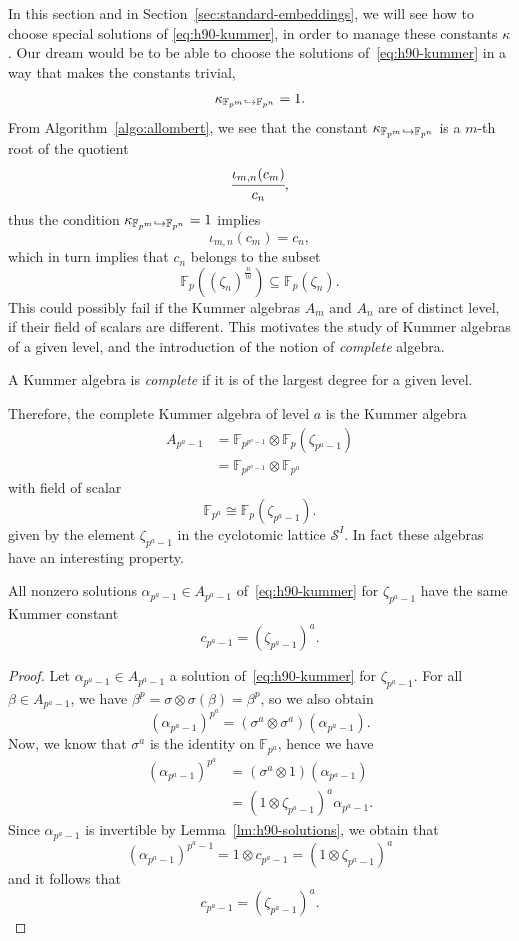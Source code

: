 In this section and in Section~\ref{sec:standard-embeddings}, we will see how to
choose special solutions of \eqref{eq:h90-kummer}, in order to manage these
constants $\kappa$. Our dream would be to be able to choose the solutions
of~\eqref{eq:h90-kummer} in a way that makes the constants trivial, \ie 
\[
  \kappa_{\mathbb{F}_{p^{m}}\hookrightarrow \mathbb{F}_{p^{n}}} = 1.
\]
From Algorithm~\ref{algo:allombert}, we see that the constant
$\kappa_{\mathbb{F}_{p^{m}}\hookrightarrow\mathbb{F}_{p^{n}}}$ is a $m$-th root of the
quotient
\[
  \cfrac{\iota_{m, n}(c_m)}{c_n},
\]
thus the condition $\kappa_{\mathbb{F}_{p^{m}}\hookrightarrow\mathbb{F}_{p^{n}}}=1$ implies
\[
  \iota_{m, n}(c_m) = c_n,
\]
which in turn implies that $c_n$ belongs to the subset
\[
  \mathbb{F}_{p}( (\zeta_n)^{\frac{n}{m}})\subseteq\mathbb{F}_p(\zeta_n).
\]
This could possibly fail if the Kummer algebras $A_m$ and $A_n$ are of distinct
level, \ie if their field of scalars are different. This motivates the study of
Kummer algebras of a given level, and the introduction of the notion of
\emph{complete} algebra.
\begin{defi}
  A Kummer algebra is \emph{complete} if it is of the largest degree for a given
  level.
\end{defi}
Therefore, the complete Kummer algebra of level $a$ is the Kummer algebra
\begin{align*}
  A_{p^a-1} &=
  \mathbb{F}_{p^{p^a-1}}\otimes\mathbb{F}_p(\zeta_{p^a-1})\\
  &=\mathbb{F}_{p^{p^a-1}}\otimes\mathbb{F}_{p^{a}}
\end{align*}
with field of scalar
\[
  \mathbb{F}_{p^{a}}\cong \mathbb{F}_p(\zeta_{p^a-1}).
\]
given by the element $\zeta_{p^a-1}$ in the cyclotomic lattice $\mathcal S^I$.
In fact these algebras have an interesting property.
\begin{lm}
  All nonzero solutions $\alpha_{p^a-1}\in A_{p^a-1}$ of~\eqref{eq:h90-kummer}
  for $\zeta_{p^a-1}$ have the same Kummer constant
  \[
    c_{p^a-1} = (\zeta_{p^a-1})^{a}.
  \]
\end{lm}
\begin{proof}
  \label{lm:complete-algebra-solutions}
  Let $\alpha_{p^a-1}\in A_{p^a-1}$ a solution of~\eqref{eq:h90-kummer} for
  $\zeta_{p^a-1}$. For all $\beta\in A_{p^a-1}$, we have $\beta^p = \sigma\otimes\sigma(\beta) =
  \beta^p$, so we also obtain 
  \[
    (\alpha_{p^a-1})^{p^a} = (\sigma^a\otimes\sigma^a)(\alpha_{p^a-1}).
  \]
  Now, we know that $\sigma^a$ is the identity on $\mathbb{F}_{p^a}$, hence we
  have
  \begin{align*}
    (\alpha_{p^a-1})^{p^a} &= (\sigma^a\otimes1)(\alpha_{p^a-1}) \\
    &= (1\otimes\zeta_{p^a-1})^a \alpha_{p^a-1}.
  \end{align*}
  Since $\alpha_{p^a-1}$ is invertible by Lemma~\ref{lm:h90-solutions}, we
  obtain that
  \[
    (\alpha_{p^a-1})^{p^a-1} = 1\otimes c_{p^a-1} = (1\otimes \zeta_{p^a-1})^a
  \]
  and it follows that
  \[
    c_{p^a-1} = (\zeta_{p^a-1})^{a}.
  \]
\end{proof}
